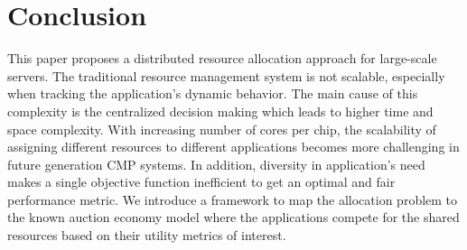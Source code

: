 \vspace{-1\baselineskip}
\section{Conclusion} 
\label{Conclusion}
This paper proposes a distributed resource allocation approach for large-scale servers. The traditional resource management system is not scalable, especially when tracking the application's dynamic behavior. The main cause of this complexity is the centralized decision making which leads to higher time and space complexity. With increasing number of cores per chip, the scalability of assigning different resources to different applications becomes more challenging in future generation CMP systems. In addition, diversity in application's need makes a single objective function inefficient to get an optimal and fair performance metric. We introduce a framework to map the allocation problem to the known auction economy model where the applications compete for the shared resources based on their utility metrics of interest.
